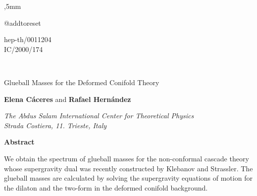 \documentclass[12pt,epsf,a4paper]{article}
\begin{document}
,5mm


\def\II{\relax{\rm 1\kern-.35em1}}
\def\IP{\relax{\rm I\kern-.18em P}}
\renewcommand{\theequation}{\thesection.\arabic{equation}}
\csname @addtoreset
\def\muh{\hat \mu}
\def\nuh{\hat \nu}
\def\rhoh{\hat \rho}
\def\lambdah{\hat \lambda}
\def\sigmah{\hat \sigma}
\def\tauh{\hat \tau}

\begin{flushright}
hep-th/0011204 \\
IC/2000/174
\end{flushright}

\begin{center}

{}~\vfill

{ {\LARGE {Glueball Masses for the Deformed Conifold Theory}}}

\vspace{20 mm}


{\bf {\large {Elena C\'aceres}}} {\large and} {\bf{\large{Rafael Hern\'{a}ndez}}}\myHighlight{$^{\dag}$}\coordHE{}

\vspace{8 mm}

{\em The Abdus Salam International Center for Theoretical Physics \\
Strada Costiera, 11. \coordHE{} Trieste, Italy}
\vspace{16 mm}

\end{center}



\begin{center}
{\bf Abstract}
\end{center}
  
\vspace{2 mm}
  

We obtain the spectrum of glueball masses for the \coordHE{} non-conformal 
cascade theory whose supergravity dual was recently constructed by Klebanov 
and Strassler. The glueball masses are calculated by solving the 
supergravity equations of motion for the dilaton and the two-form 
in the deformed conifold background.

\vspace{42 mm}

{\footnotesize \dag}
\end{document}
